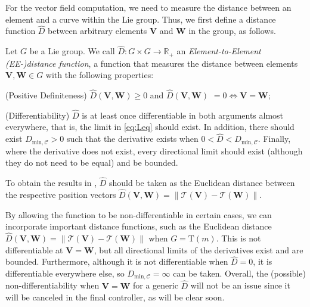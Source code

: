 For the vector field computation, we need to measure the distance between an element and a curve within the Lie group. Thus, we first define a distance function $\widehat{D}$ between arbitrary elements $\mathbf{V}$ and $\mathbf{W}$ in the group, as follows.
\begin{definition}\label{def:distance-D-hat-arbitrary-elements}
    Let $G$ be a Lie group. We call $\widehat{D}:G\times G\to \mathbb{R}_+$ an \emph{Element-to-Element} \emph{(EE-)distance function}, a function that measures the distance between elements $\mathbf{V}, \mathbf{W}\in G$ with the following properties: 
    \begin{property}
        \item (Positive Definiteness) $\widehat{D}(\mathbf{V}, \mathbf{W}) \ge 0$ and $\widehat{D}(\mathbf{V}, \mathbf{W})$ $= 0 \iff \mathbf{V}=\mathbf{W}$;\label{prop:Dhat-positive-definite}
        \item (Differentiability) $\widehat{D}$ is at least once differentiable in both arguments almost everywhere, that is, the limit in \eqref{eq:Leq} should exist. In addition, there should exist $D_{\text{min},\mathcal{C}}>0$ such that the derivative exists when $0 < \widehat{D} < D_{\text{min},\mathcal{C}}$. Finally, where the derivative does not exist, every directional limit should exist (although they do not need to be equal) and be bounded. \label{prop:Dhat-differentiability}
    \end{property}
\end{definition}

\begin{example}\label{ex:adriano-distance-function}
    To obtain the results in \citet{Rezende2022}, $\widehat{D}$ should be taken as the Euclidean distance between the respective position vectors $\widehat{D}(\mathbf{V}, \mathbf{W}) = \|\mathcal{T}(\mathbf{V}) - \mathcal{T}(\mathbf{W})\|$. 
\end{example}

By allowing the function to be non-differentiable in certain cases, we can incorporate important distance functions, such as the Euclidean distance $\widehat{D}(\mathbf{V},\mathbf{W}) = \|\mathcal{T}(\mathbf{V}) - \mathcal{T}(\mathbf{W})\|$ when $G=\text{T}(m)$. This  is not differentiable at $\mathbf{V}=\mathbf{W}$, but all directional limits of the derivatives exist and are bounded. Furthermore, although it is not differentiable when $\widehat{D}=0$, it is differentiable everywhere else, so $D_{\text{min},\mathcal{C}} = \infty$ can be taken. Overall, the (possible) non-differentiability when $\mathbf{V}=\mathbf{W}$  for a generic $\widehat{D}$ will not be an issue since it will be canceled in the final controller, as will be clear soon.

